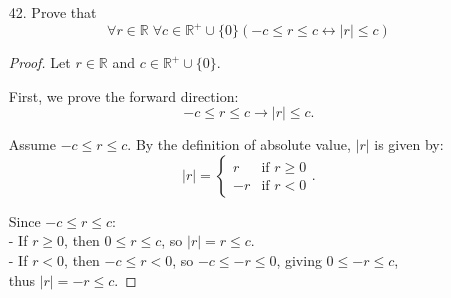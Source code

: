 \documentclass[12pt]{article}
\newcommand{\R}{\mathbb{R}}
\newcommand{\paren}[1]{\left( #1 \right)}
\newcommand{\abso}[1]{\left|#1 \right|}
\newcommand{\zero}{\{0\}}
\begin{document}
\begin{enumerate}
\begin{enumerate}
\begin{proof}
                \textbf{Case 4:} Suppose \( m \bmod 5 = 3 \). Then we can rewrite \( m \) as follows
                \[ m = 5q + 3. \]
                Consequently,
                \[ m^2 = (5q + 3)^2 = 25q^2 + 30q + 9 = 5(5q^2 + 6q + 1) + 4. \]
                Let \( k_3 = 5q^2 + 6q + 1 \in \mathbb{Z} \). Since integers are closed under multiplication and addition, we see that \( m^2 \) is in the form \( m^2 = 5k_3 + 4 \).
                
                \textbf{Case 5:} Suppose \( m \bmod 5 = 4 \). Then we can rewrite \( m \) as follows
                \[ m = 5q + 4. \]
                Consequently,
                \[ m^2 = (5q + 4)^2 = 25q^2 + 40q + 16 = 5(5q^2 + 8q + 3) + 1. \]
                Let \( k_4 = 5q^2 + 8q + 3 \in \mathbb{Z} \). Since integers are closed under multiplication and addition, we see that \( m^2 \) is in the form \( m^2 = 5k_4 + 1 \).
                
                In all cases, we have shown that \( m^2 \) is either of the form \( 5k \), \( 5k+1 \), or \( 5k+4 \) for some integer \( k \).
                \end{proof}

             \item[42.] Prove that
                \[
                \forall r \in \R \; \forall c \in \R^+ \cup \zero \paren{ -c \leq r \leq c \leftrightarrow \abso{r}\leq c}
                \]
                \begin{proof}
                Let \( r \in \mathbb{R} \) and \( c \in \mathbb{R}^+ \cup \{0\} \).
                
                First, we prove the forward direction:
                \[ -c \leq r \leq c \rightarrow |r| \leq c. \]
                
                Assume \( -c \leq r \leq c \). By the definition of absolute value, \( |r| \) is given by:
                \[ 
                |r| = 
                \begin{cases} 
                r & \text{if } r \geq 0 \\
                -r & \text{if } r < 0 
                \end{cases}.
                \]
                
                Since \( -c \leq r \leq c \):\\
                - If \( r \geq 0 \), then \( 0 \leq r \leq c \), so \( |r| = r \leq c \).\\
                - If \( r < 0 \), then \( -c \leq r < 0 \), so \( -c \leq -r \leq 0 \), giving \( 0 \leq -r \leq c \),\\ thus \( |r| = -r \leq c \).
                

\end{proof}
\end{enumerate}
\end{enumerate}
\end{document}
